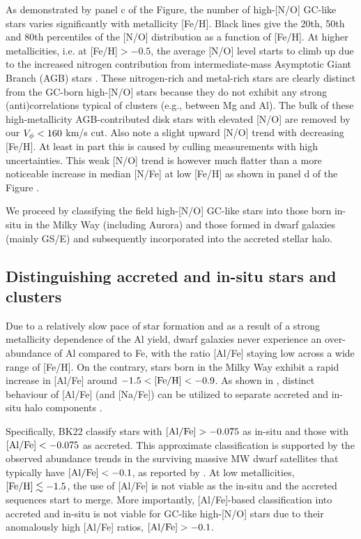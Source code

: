 \documentclass[a4paper,useAMS,usenatbib]{mnras}
\begin{document}
As demonstrated by panel c of the Figure, the number of high-[N/O] GC-like stars varies significantly with metallicity [Fe/H]. Black lines give the 20th, 50th and 80th percentiles of the [N/O] distribution as a function of [Fe/H]. At higher metallicities, i.e. at [Fe/H]$>-0.5$, the average [N/O] level starts to climb up due to the increased nitrogen contribution from intermediate-mass Asymptotic Giant Branch (AGB) stars \citep[see, e.g.,][]{Kobayashi2020,Johnson2023}. These nitrogen-rich and metal-rich stars are clearly distinct from the GC-born high-[N/O] stars because they do not exhibit any strong (anti)correlations typical of clusters (e.g., between Mg and Al). The bulk of these high-metallicity AGB-contributed disk stars with elevated [N/O] are removed by our $V_{\rm \phi}<160$ km/s cut. Also note a slight upward [N/O] trend with decreasing [Fe/H]. At least in part this is caused by culling measurements with high uncertainties. This weak [N/O] trend is however much flatter than a more noticeable increase in median [N/Fe] at low [Fe/H] as shown in panel d of the Figure \citep[see also Figure 1 of][]{Schiavon2017}.

We proceed by classifying the field high-[N/O] GC-like stars into those born in-situ in the Milky Way (including Aurora) and those formed in dwarf galaxies  (mainly GS/E) and subsequently incorporated into the accreted stellar halo.

\subsection{Distinguishing accreted and in-situ  stars and clusters}

Due to a relatively slow pace of star formation and as a result of a strong metallicity dependence of the Al yield, dwarf galaxies never experience an over-abundance of Al compared to Fe, with the ratio [Al/Fe] staying low across a wide range of [Fe/H]. On the contrary, stars born in the Milky Way exhibit a rapid increase in [Al/Fe] around $-1.5\rm <[Fe/H]<-0.9$. As shown in \citet{Hawkins2015}, distinct behaviour of [Al/Fe] (and [Na/Fe]) can be utilized to separate accreted and in-situ halo components \citep[see also][]{Das2020}. 

Specifically, BK22 classify stars with $\rm [Al/Fe]>-0.075$ as in-situ and those with $\rm [Al/Fe]<-0.075$ as accreted. This approximate classification is supported by the observed abundance trends in the surviving massive MW dwarf satellites that typically have $\rm [Al/Fe]<-0.1$, as reported by \citet{Hasselquist2021}. At low metallicities, $\rm [Fe/H]\lesssim-1.5$, the use of [Al/Fe] is not viable as the in-situ and the accreted sequences start to merge. More importantly, [Al/Fe]-based classification into accreted and in-situ is not viable for GC-like high-[N/O] stars due to their anomalously high [Al/Fe] ratios, $\rm [Al/Fe]>-0.1$.
\end{document}
